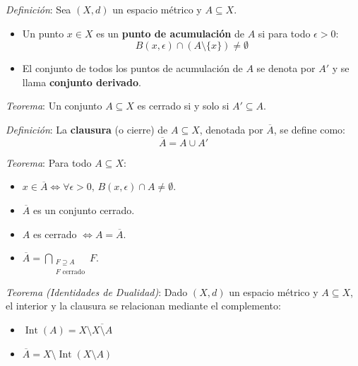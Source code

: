 \documentclass{beamer}
\begin{document}
  \begin{frame}
    \textit{Definición}: Sea $(X, d)$ un espacio métrico y $A \subseteq X$.
    \newline

    \begin{itemize}[<+->]
      \item Un punto $x \in X$ es un \textbf{punto de acumulación} 
            de $A$ si para todo $\epsilon > 0$:
            \[ B(x, \epsilon) \cap (A \setminus \{x\}) \neq \emptyset \]
      \item El conjunto de todos los puntos de acumulación de $A$
            se denota por $A'$ y se llama \textbf{conjunto derivado}.
    \end{itemize}

    \pause

    \vspace{0.5em}
    \textit{Teorema}: Un conjunto $A \subseteq X$ es cerrado si y solo si $A' \subseteq A$.
  \end{frame}

  \begin{frame}
    \textit{Definición}: La \textbf{clausura} (o cierre) de 
                $A \subseteq X$, denotada por $\overline{A}$, se define como:
    \[ \overline{A} = A \cup A' \]

    \pause

    \textit{Teorema}: Para todo $A \subseteq X$:
    \newline
    \begin{itemize}[<+->]
      \item $x \in \overline{A} \iff \forall \epsilon > 0,
            \, B(x, \epsilon) \cap A \neq \emptyset$.
      \item $\overline{A}$ es un conjunto cerrado.
      \item $A$ es cerrado $\iff A = \overline{A}$.
      \item $\overline{A} = 
             \displaystyle\bigcap_{\substack{F \supseteq A \\ F \text{ cerrado}}} F$.
    \end{itemize}
  \end{frame}

  \begin{frame}
    \textit{Teorema (Identidades de Dualidad)}:
    \newline\newline
    Dado $(X, d)$ un espacio métrico y $A \subseteq X$,
    el interior y la clausura se relacionan mediante el complemento:
    \newline

    \begin{itemize}[<+->]
      \item $\operatorname{Int}(A) = X \setminus \overline{X \setminus A}$
      \item $\overline{A} = X \setminus \operatorname{Int}(X \setminus A)$
    \end{itemize}
  \end{frame}
\end{document}
